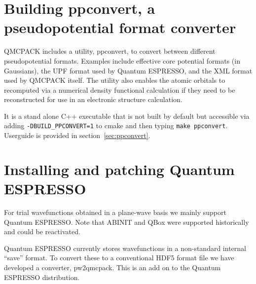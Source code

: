 \section{Building ppconvert, a pseudopotential format converter}
\label{sec:buildppconvert}
QMCPACK includes a utility, ppconvert, to convert between different
pseudopotential formats. Examples include effective core potential
formats (in Gaussians), the UPF format used by Quantum ESPRESSO, and
the XML format used by QMCPACK itself. The utility also enables the
atomic orbitals to recomputed via a numerical density functional
calculation if they need to be reconstructed for use in an
electronic structure calculation.

It is a stand alone C++ executable that is not built by default but accessible via adding
\texttt{-DBUILD\_PPCONVERT=1} to cmake and then typing \texttt{make ppconvert}.
Userguide is provided in section~\ref{sec:ppconvert}.

\section{Installing and patching Quantum ESPRESSO}
\label{sec:buildqe}
For trial wavefunctions obtained in a plane-wave basis we mainly
support Quantum ESPRESSO. Note that ABINIT and QBox were supported historically
and could be reactivated.

Quantum ESPRESSO currently stores wavefunctions in a non-standard internal
``save'' format. To convert these to a conventional HDF5 format file
we have developed a converter, pw2qmcpack. This is an add on to the
Quantum ESPRESSO distribution.

